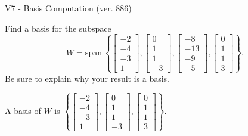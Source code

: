 \begin{exercise}
  \begin{exerciseTitle}V7 - Basis Computation (ver. 886)\end{exerciseTitle}
  \begin{exerciseStatement}
    Find a basis for the subspace 
\[W=\mathrm{span}\ \left\{\left[\begin{array}{r}
-2 \\
-4 \\
-3 \\
1
\end{array}\right] , \left[\begin{array}{r}
0 \\
1 \\
1 \\
-3
\end{array}\right] , \left[\begin{array}{r}
-8 \\
-13 \\
-9 \\
-5
\end{array}\right] , \left[\begin{array}{r}
0 \\
1 \\
1 \\
3
\end{array}\right]\right\}.\]
 Be sure to explain why your result is a basis.


  \end{exerciseStatement}
  \begin{exerciseAnswer}
   A basis of \(W\) is  \(\left\{\left[\begin{array}{r}
-2 \\
-4 \\
-3 \\
1
\end{array}\right] , \left[\begin{array}{r}
0 \\
1 \\
1 \\
-3
\end{array}\right] , \left[\begin{array}{r}
0 \\
1 \\
1 \\
3
\end{array}\right]\right\}\).
  


  \end{exerciseAnswer}
\end{exercise}